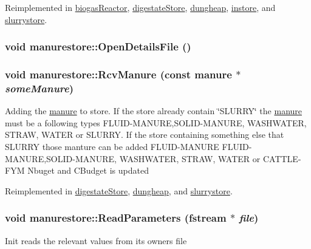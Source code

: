 Reimplemented in \hyperlink{classbiogas_reactor_ab2482d657ec9095da5aef508d0841e0e}{biogasReactor}, \hyperlink{classdigestate_store_ae1402687e7bf67b150bf01e97c4798b9}{digestateStore}, \hyperlink{classdungheap_ac8c6b260da69dabe3a0019f9a5d8d499}{dungheap}, \hyperlink{classinstore_afbd76ef97e35ef93c4945667e8341945}{instore}, and \hyperlink{classslurrystore_a982183d9d72019736bfdb792c4cb5d78}{slurrystore}.\hypertarget{classmanurestore_afa2fa1cefd539b876b5b92250d55f03d}{
\subsubsection[{OpenDetailsFile}]{\setlength{\rightskip}{0pt plus 5cm}void manurestore::OpenDetailsFile ()}}
\label{classmanurestore_afa2fa1cefd539b876b5b92250d55f03d}
\hypertarget{classmanurestore_ab32685c2f4be9bb58269655cab7c96ee}{
\subsubsection[{RcvManure}]{\setlength{\rightskip}{0pt plus 5cm}void manurestore::RcvManure (const {\bf manure} $\ast$ {\em someManure})}}
\label{classmanurestore_ab32685c2f4be9bb58269655cab7c96ee}
Adding the \hyperlink{classmanure}{manure} to store. If the store already contain \char`\"{}SLURRY\char`\"{} the \hyperlink{classmanure}{manure} must be a following types FLUID-\/MANURE,SOLID-\/MANURE, WASHWATER, STRAW, WATER or SLURRY. If the store containing something else that SLURRY those manture can be added FLUID-\/MANURE FLUID-\/MANURE,SOLID-\/MANURE, WASHWATER, STRAW, WATER or CATTLE-\/FYM Nbuget and CBudget is updated 

Reimplemented in \hyperlink{classdigestate_store_a840cf55a8a893f089c8c39a36cc3defe}{digestateStore}, \hyperlink{classdungheap_a852054912c04f101c0a3310e80d6d53b}{dungheap}, and \hyperlink{classslurrystore_af99a5bbcf35c6845fcf989809c5347fa}{slurrystore}.\hypertarget{classmanurestore_ae639f0ef3e9fee3416a2bfd2ab1ef496}{
\subsubsection[{ReadParameters}]{\setlength{\rightskip}{0pt plus 5cm}void manurestore::ReadParameters (fstream $\ast$ {\em file})}}
\label{classmanurestore_ae639f0ef3e9fee3416a2bfd2ab1ef496}
Init reads the relevant values from its owners file 

